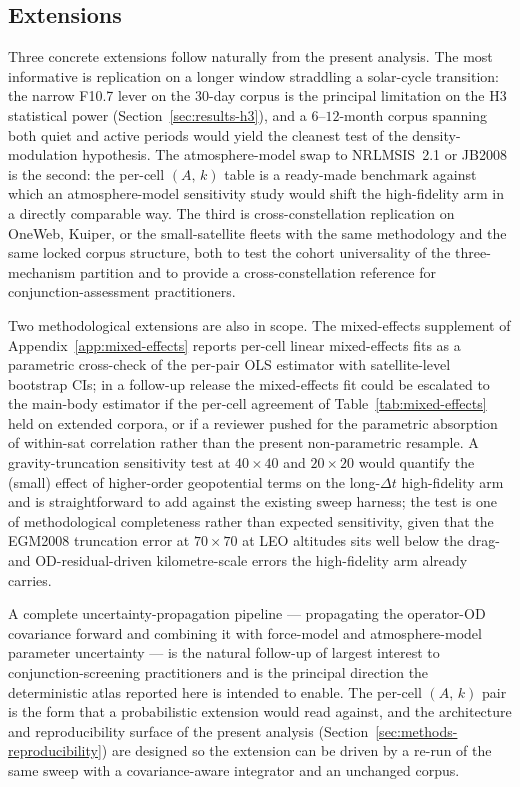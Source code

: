\documentclass[10pt, letterpaper]{article}
\begin{document}
\subsection{Extensions}
\label{sec:discussion-extensions}

Three concrete extensions follow naturally from the present
analysis. The most informative is replication on a longer window
straddling a solar-cycle transition: the narrow F10.7 lever on the
30-day corpus is the principal limitation on the H3 statistical
power (Section~\ref{sec:results-h3}), and a $6$--$12$-month corpus
spanning both quiet and active periods would yield the cleanest
test of the density-modulation hypothesis. The atmosphere-model
swap to NRLMSIS~2.1 \citep{emmert2021} or JB2008
\citep{bowman2008} is the second: the per-cell $(A,\,k)$ table is
a ready-made benchmark against which an atmosphere-model
sensitivity study would shift the high-fidelity arm in a directly
comparable way. The third is cross-constellation replication on
OneWeb, Kuiper, or the small-satellite fleets with the same
methodology and the same locked corpus structure, both to test
the cohort universality of the three-mechanism partition and to
provide a cross-constellation reference for conjunction-assessment
practitioners.

Two methodological extensions are also in scope. The
mixed-effects supplement of Appendix~\ref{app:mixed-effects}
reports per-cell linear mixed-effects fits as a parametric
cross-check of the per-pair OLS estimator with satellite-level
bootstrap CIs; in a follow-up release the mixed-effects fit
could be escalated to the main-body estimator if the per-cell
agreement of Table~\ref{tab:mixed-effects} held on extended
corpora, or if a reviewer pushed for the parametric absorption
of within-sat correlation rather than the present non-parametric
resample. A gravity-truncation sensitivity test at
$40\!\times\!40$ and $20\!\times\!20$ would quantify the (small)
effect of higher-order geopotential terms on the long-$\Delta t$
high-fidelity arm and is straightforward to add against the
existing sweep harness; the test is one of methodological
completeness rather than expected sensitivity, given that the
EGM2008 truncation error at $70\!\times\!70$ at LEO altitudes
\citep{pavlis2012} sits well below the drag- and
OD-residual-driven kilometre-scale errors the high-fidelity arm
already carries.

A complete uncertainty-propagation pipeline --- propagating the
operator-OD covariance forward and combining it with force-model
and atmosphere-model parameter uncertainty --- is the natural
follow-up of largest interest to conjunction-screening
practitioners and is the principal direction the deterministic
atlas reported here is intended to enable. The per-cell
$(A,\,k)$ pair is the form that a probabilistic extension would
read against, and the architecture and reproducibility surface
of the present analysis
(Section~\ref{sec:methods-reproducibility}) are designed so the
extension can be driven by a re-run of the same sweep with a
covariance-aware integrator and an unchanged corpus.
\end{document}
